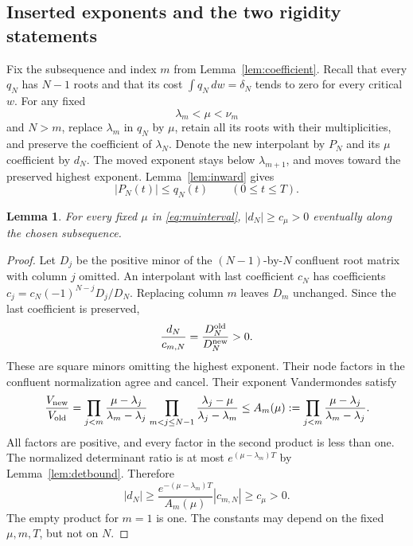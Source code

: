\documentclass[11pt]{article}
\newtheorem{lemma}[theorem]{Lemma}
\theoremstyle{remark}
\begin{document}
\subsection{Inserted exponents and the two rigidity statements}

Fix the subsequence and index $m$ from Lemma~\ref{lem:coefficient}.
Recall that every $q_N$ has $N-1$ roots and that its cost
$\int q_N\,dw=\delta_N$ tends to zero for every critical $w$.
For any fixed
\begin{equation}\label{eq:muinterval}
 \lambda_m<\mu<\nu_m
\end{equation}
and $N>m$, replace $\lambda_m$ in $q_N$ by $\mu$, retain all its roots
with their multiplicities, and preserve the coefficient of $\lambda_N$.
Denote the new interpolant by $P_N$ and its $\mu$ coefficient by $d_N$.
The moved exponent stays below $\lambda_{m+1}$, and moves toward the
preserved highest exponent. Lemma~\ref{lem:inward} gives
\begin{equation}\label{eq:insertbound}
 |P_N(t)|\le q_N(t)\qquad(0\le t\le T).
\end{equation}

\begin{lemma}\label{lem:insertcoef}
For every fixed $\mu$ in \eqref{eq:muinterval}, $|d_N|\ge c_\mu>0$
eventually along the chosen subsequence.
\end{lemma}
\begin{proof}
Let $D_j$ be the positive minor of the $(N-1)$-by-$N$ confluent root
matrix with column $j$ omitted. An interpolant with last coefficient $c_N$
has coefficients $c_j=c_N(-1)^{N-j}D_j/D_N$. Replacing column $m$
leaves $D_m$ unchanged. Since the last coefficient is preserved,
\begin{equation}\label{eq:cofactorratio}
 \frac{d_N}{c_{m,N}}=\frac{D_N^{\rm old}}{D_N^{\rm new}}>0.
\end{equation}
These are square minors omitting the highest exponent. Their node factors
in the confluent normalization agree and cancel. Their exponent
Vandermondes satisfy
\[
 \frac{V_{\rm new}}{V_{\rm old}}
 =\prod_{j<m}\frac{\mu-\lambda_j}{\lambda_m-\lambda_j}
  \prod_{m<j\le N-1}\frac{\lambda_j-\mu}{\lambda_j-\lambda_m}
 \le A_m(\mu):=\prod_{j<m}\frac{\mu-\lambda_j}{\lambda_m-\lambda_j}.
\]
All factors are positive, and every factor in the second product is less
than one. The normalized determinant ratio is at most
$e^{(\mu-\lambda_m)T}$ by Lemma~\ref{lem:detbound}. Therefore
\begin{equation}\label{eq:dnonzero}
 |d_N|\ge\frac{e^{-(\mu-\lambda_m)T}}{A_m(\mu)}|c_{m,N}|
       \ge c_\mu>0.
\end{equation}
The empty product for $m=1$ is one. The constants may depend on the fixed
$\mu,m,T$, but not on $N$.
\end{proof}
\end{document}
